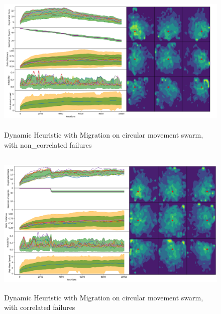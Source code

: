 \documentclass{UoYCSproject}
\begin{document}
\begin{figure}[htb]
\label{fig:circle_movement_non3}
\begin{center}
\centering
\includegraphics[height=7cm]{"./Dynamic_Migration/Circle_Move_non2.png"}
\caption{Dynamic Heuristic with Migration on circular movement swarm, with non\_correlated failures}
\end{center}
\end{figure}

\begin{figure}[htb]
\label{fig:circle_movement_con3}
\begin{center}
\centering
\includegraphics[height=7cm]{"./Dynamic_Migration/Circle_Move_con.png"}
\caption{Dynamic Heuristic with Migration on circular movement swarm, with correlated failures}
\end{center}
\end{figure}

\end{document}
